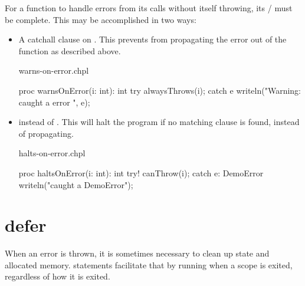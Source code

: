 For a function to handle errors from its calls without itself throwing,
its / must be complete. This may be accomplished
in two ways:

\begin{itemize}

\item A catchall clause on . This prevents  from
propagating the error out of the function as described above.

\begin{chapelexample}{warns-on-error.chpl}
\begin{chapel}
proc warnsOnError(i: int): int {
  try {
    alwaysThrows(i);
  } catch e {
    writeln("Warning: caught a error ", e);
  }
}
\end{chapel}
\begin{chapelpost}
\end{chapelpost}
\begin{chapeloutput}
\end{chapeloutput}
\end{chapelexample}

\item
{} instead of . This will halt the program if no matching
 clause is found, instead of propagating.

\begin{chapelexample}{halts-on-error.chpl}
\begin{chapel}
proc haltsOnError(i: int): int {
  try! {
    canThrow(i);
  } catch e: DemoError {
    writeln("caught a DemoError");
  }
}
\end{chapel}
\begin{chapelpost}
\end{chapelpost}
\begin{chapeloutput}
\end{chapeloutput}
\end{chapelexample}

\end{itemize}

\section{defer}
\label{Errors_defer}

When an error is thrown, it is sometimes necessary to clean up state and
allocated memory.  statements facilitate that by running when a
scope is exited, regardless of how it is exited.

